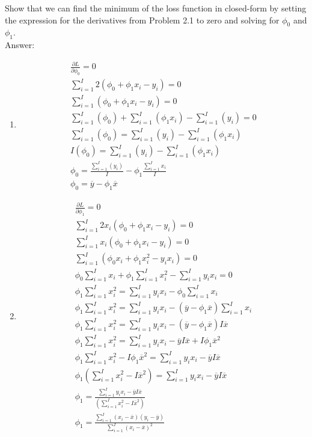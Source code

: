 \documentclass[10pt]{article}
\begin{document}
Show that we can find the minimum of the loss function in closed-form by setting the expression for the derivatives from Problem 2.1 to zero and solving for $\phi_0$ and $\phi_1$. \\
Answer:
    \begin{enumerate}
        \item \begin{align*}
            \frac{\partial L}{\partial \phi_0} = 0 \\
            \sum_{i=1}^{I} 2 (\phi_0 + \phi_1x_i - y_i) = 0 \\
            \sum_{i=1}^{I} (\phi_0 + \phi_1x_i - y_i) = 0 \\
            \sum_{i=1}^{I} (\phi_0) + \sum_{i=1}^{I} (\phi_1x_i) - \sum_{i=1}^{I} (y_i) = 0 \\ 
            \sum_{i=1}^{I} (\phi_0) = \sum_{i=1}^{I} (y_i) - \sum_{i=1}^{I} (\phi_1x_i) \\
            I(\phi_0) = \sum_{i=1}^{I} (y_i) - \sum_{i=1}^{I} (\phi_1x_i) \\ 
            \phi_0 = \frac{\sum_{i=1}^{I} (y_i)}{I}  - \phi_1 \frac{\sum_{i=1}^{I}x_i}{I} \\
            \phi_0 = \overline{y} - \phi_1 \overline{x}
        \end{align*}
        \item \begin{align*}
            \frac{\partial L}{\partial \phi_1} = 0 \\
            \sum_{i=1}^{I} 2x_i (\phi_0 + \phi_1x_i - y_i) = 0 \\
            \sum_{i=1}^{I} x_i (\phi_0 + \phi_1x_i - y_i) = 0 \\ 
            \sum_{i=1}^{I} (\phi_0x_i + \phi_1x_i^2 - y_ix_i) = 0 \\ 
            \phi_0 \sum_{i=1}^{I}x_i + \phi_1\sum_{i=1}^{I}x_i^2 - \sum_{i=1}^{I} y_ix_i = 0 \\ 
            \phi_1\sum_{i=1}^{I}x_i^2 = \sum_{i=1}^{I} y_ix_i - \phi_0 \sum_{i=1}^{I}x_i  \\ 
            \phi_1\sum_{i=1}^{I}x_i^2 = \sum_{i=1}^{I} y_ix_i - (\overline{y} - \phi_1 \overline{x}) \sum_{i=1}^{I}x_i \\
            \phi_1\sum_{i=1}^{I}x_i^2 = \sum_{i=1}^{I} y_ix_i - (\overline{y} - \phi_1 \overline{x}) I\overline{x} \\  
            \phi_1\sum_{i=1}^{I}x_i^2 = \sum_{i=1}^{I} y_ix_i - \overline{y}I\overline{x} + I\phi_1 \overline{x}^2 \\
            \phi_1\sum_{i=1}^{I}x_i^2 - I\phi_1 \overline{x}^2 = \sum_{i=1}^{I} y_ix_i - \overline{y}I\overline{x} \\ 
            \phi_1(\sum_{i=1}^{I}x_i^2 - I\overline{x}^2)= \sum_{i=1}^{I} y_ix_i - \overline{y}I\overline{x} \\ 
            \phi_1 = \frac{\sum_{i=1}^{I} y_ix_i - \overline{y}I\overline{x}}{(\sum_{i=1}^{I}x_i^2 - I\overline{x}^2)} \\ 
            \phi_1 = \frac{\sum_{i=1}^{I} (x_i -\overline{x}) (y_i - \overline{y})}{\sum_{i=1}^{I}(x_i -\overline{x})^2} 
        \end{align*}
    \end{enumerate}
\end{document}
